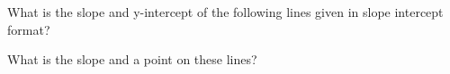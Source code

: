 \documentclass[12pt, a4paper, addpoints]{exam}
\newcommand{\verticalspace}{\vspace{44mm}} %
\begin{document}
\noindent 
\begin{questions}
\LARGE

\question What is the slope and y-intercept of the following lines given in slope intercept format?

\begin{multicols}{2}
\end{multicols}

\newpage
\question What is the slope and a point on these lines?

\begin{multicols}{2}
\end{multicols}
\end{questions}
\end{document}
